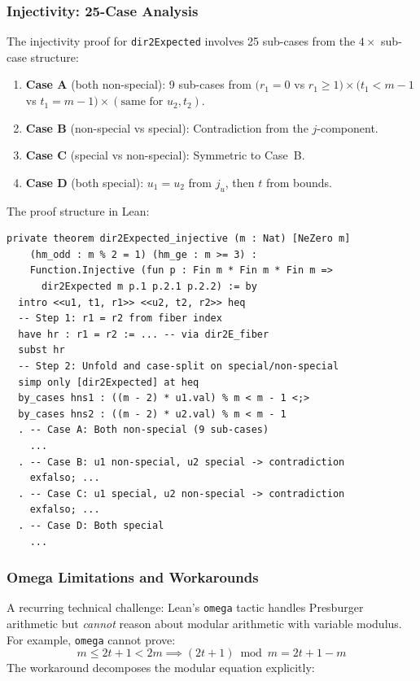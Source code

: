 \documentclass[11pt,a4paper]{article}
\begin{document}
\subsubsection{Injectivity: 25-Case Analysis}

The injectivity proof for \texttt{dir2Expected} involves 25 sub-cases from the
$4 \times$ sub-case structure:

\begin{enumerate}
  \item \textbf{Case A} (both non-special): 9 sub-cases from $(r_1{=}0$ vs $r_1{\ge}1) \times (t_1{<}m{-}1$ vs $t_1{=}m{-}1) \times (\text{same for } u_2, t_2)$.
  \item \textbf{Case B} (non-special vs special): Contradiction from the $j$-component.
  \item \textbf{Case C} (special vs non-special): Symmetric to Case~B.
  \item \textbf{Case D} (both special): $u_1 = u_2$ from $j_u$, then $t$ from bounds.
\end{enumerate}

The proof structure in Lean:

\begin{lstlisting}[caption={Injectivity proof structure}]
private theorem dir2Expected_injective (m : Nat) [NeZero m]
    (hm_odd : m % 2 = 1) (hm_ge : m >= 3) :
    Function.Injective (fun p : Fin m * Fin m * Fin m =>
      dir2Expected m p.1 p.2.1 p.2.2) := by
  intro <<u1, t1, r1>> <<u2, t2, r2>> heq
  -- Step 1: r1 = r2 from fiber index
  have hr : r1 = r2 := ... -- via dir2E_fiber
  subst hr
  -- Step 2: Unfold and case-split on special/non-special
  simp only [dir2Expected] at heq
  by_cases hns1 : ((m - 2) * u1.val) % m < m - 1 <;>
  by_cases hns2 : ((m - 2) * u2.val) % m < m - 1
  . -- Case A: Both non-special (9 sub-cases)
    ...
  . -- Case B: u1 non-special, u2 special -> contradiction
    exfalso; ...
  . -- Case C: u1 special, u2 non-special -> contradiction
    exfalso; ...
  . -- Case D: Both special
    ...
\end{lstlisting}

\subsubsection{Omega Limitations and Workarounds}

A recurring technical challenge: Lean's \texttt{omega} tactic handles Presburger arithmetic
but \emph{cannot} reason about modular arithmetic with variable modulus.
For example, \texttt{omega} cannot prove:
\[
  m \le 2t + 1 < 2m \implies (2t + 1) \bmod m = 2t + 1 - m
\]
The workaround decomposes the modular equation explicitly:
\end{document}
